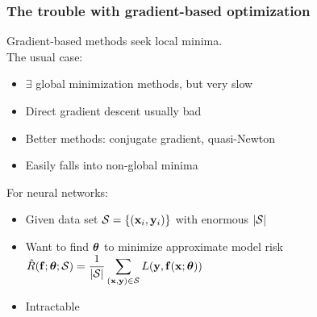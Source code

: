 \begin{frame}
    \frametitle{The trouble with gradient-based optimization}

    Gradient-based methods \citep{PressNR} seek local minima. \\[1ex]

    The usual case:
    \begin{itemize}
        \item $\exists$ global minimization methods, but very slow
        \item Direct gradient descent usually bad
        \item Better methods: conjugate gradient, quasi-Newton
        \item \alert{Easily falls into non-global minima}
    \end{itemize}
    \pause

    For neural networks:
    \begin{itemize}
        \item Given data set $\S = \{(\x_i, \y_i)\}$ with enormous $|\S|$
        \item Want to find $\THETA$ to minimize approximate model risk $\displaystyle \hat{R}(\f; \THETA; \S) = \frac{1}{|\S|} \sum_{(\x, \y) \in \S} L(\y, \f(\x; \THETA))$
        \item \alert{Intractable}
    \end{itemize}
\end{frame}

